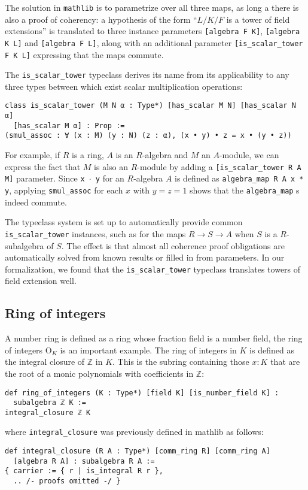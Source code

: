 \documentclass[a4paper,USenglish,cleveref, autoref, thm-restate]{lipics-v2021}
\newcommand{\lean}[1]{\texttt{#1}\xspace} %
\newcommand{\OK}{\mathrm{O}_K}
\newcommand{\mathlib}{\texttt{mathlib}\xspace}
\newcommand{\Z}{\mathbb{Z}}
\begin{document}
The solution in \mathlib is to parametrize over all three maps, as long a there is also a proof of coherency:
a hypothesis of the form ``$L / K / F$ is a tower of field extensions'' is translated to three instance parameters \lean{[algebra F K]}, \lean{[algebra K L]} and \lean{[algebra F L]},
along with an additional parameter \lean{[is\_scalar\_tower F K L]} expressing that the maps commute.

The \lean{is\_scalar\_tower} typeclass derives its name from its applicability to any three types between which exist scalar multiplication operations:
\begin{lstlisting}
class is_scalar_tower (M N α : Type*) [has_scalar M N] [has_scalar N α]
  [has_scalar M α] : Prop :=
(smul_assoc : ∀ (x : M) (y : N) (z : α), (x • y) • z = x • (y • z))
\end{lstlisting}
For example, if $R$ is a ring, $A$ is an $R$-algebra and $M$ an $A$-module, we can express the fact that $M$ is also an $R$-module by adding a \lean{[is\_scalar\_tower R A M]} parameter.
Since \lean{x $\cdot$ y} for an $R$-algebra $A$ is defined as \lean{algebra\_map R A x * y}, applying \lean{smul\_assoc} for each $x$ with $y = z = 1$ shows that the \lean{algebra\_map}s indeed commute.

The typeclass system is set up to automatically provide common \lean{is\_scalar\_tower} instances,
such as for the maps $R \to S \to A$ when $S$ is a $R$-subalgebra of $S$.
The effect is that almost all coherence proof obligations are automatically solved from known results or filled in from parameters.
In our formalization, we found that the \lean{is\_scalar\_tower} typeclass translates towers of field extension well.

\subsection{Ring of integers}

A number ring is defined as a ring whose fraction field is a number field, the ring of integers $\OK$ is an important example.
The ring of integers in $K$ is defined as the integral closure of $\Z$ in $K$.
This is the subring containing those $x : K$ that are the root of a monic polynomials with coefficients in $\Z$:
\begin{lstlisting}
def ring_of_integers (K : Type*) [field K] [is_number_field K] :
  subalgebra ℤ K :=
integral_closure ℤ K
\end{lstlisting}
where \lean{integral\_closure} was previously defined in mathlib as follows:
\begin{lstlisting}
def integral_closure (R A : Type*) [comm_ring R] [comm_ring A]
  [algebra R A] : subalgebra R A :=
{ carrier := { r | is_integral R r },
  .. /- proofs omitted -/ }
\end{lstlisting}
\end{document}
